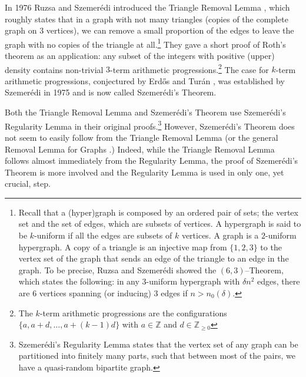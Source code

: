 \documentclass[10pt]{article}
\newcommand{\Z}{\mathbb Z}
\begin{document}
In 1976 Ruzsa and Szemer\'edi introduced the Triangle Removal Lemma \cite{ruzsze78}, which roughly states that in a graph with not many triangles (copies of the complete graph on $3$ vertices), we can remove a small proportion of the edges to leave the graph with no copies of the triangle at all.\footnote{Recall that a (hyper)graph is composed by an ordered pair of sets; the vertex set and the set of edges, which are subsets of vertices. A hypergraph is said to be $k$-uniform if all the edges are subsets of $k$ vertices. A graph is a $2$-uniform hypergraph. A copy of a triangle is an injective map from $\{1,2,3\}$ to the vertex set of the graph that sends an edge of the triangle to an edge in the graph. To be precise, Ruzsa and Szemer\'edi showed the $(6,3)$--Theorem, which states the following: in any $3$-uniform hypergraph with $\delta n^2$ edges, there are $6$ vertices spanning (or inducing) $3$ edges if $n>n_0(\delta)$.} They gave a short proof of Roth's theorem \cite{rot53} as an application: any subset of the integers with positive (upper) density contains non-trivial $3$-term arithmetic progressions.\footnote{The $k$-term arithmetic progressions are the configurations $\{a,a+d,\ldots,a+(k-1)d\}$ with $a\in\Z$ and $d\in \Z_{\geq 0}$} 
The case for $k$-term arithmetic progressions, conjectured by Erd\H{o}s and Tur\'an \cite{tur41},  was established by Szemer\'edi in 1975 and is now called Szemer\'edi's Theorem.

	Both the Triangle Removal Lemma and Szemer\'edi's Theorem use Szemer\'edi's Regularity Lemma \cite{sze78} in their original proofs.\footnote{Szemer\'edi's Regularity Lemma states that the vertex set of any graph can be partitioned into finitely many parts, such that between most of the pairs, we have a quasi-random bipartite graph.} However, Szemer\'edi's Theorem does not seem to easily follow from the Triangle Removal Lemma (or the general Removal Lemma for Graphs \cite{erdfranrod86,fur95}.) Indeed, while the Triangle Removal Lemma follows almost immediately  from the Regularity Lemma, the proof of Szemer\'edi's Theorem is more involved and the Regularity Lemma is used in only one, yet crucial, step.
\end{document}
